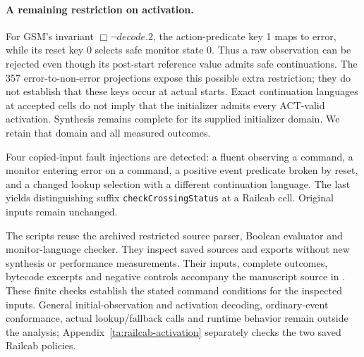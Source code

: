 \paragraph{A remaining restriction on activation.}
For GSM's invariant $\Box\neg\mathit{decode.2}$, the action-predicate key 1 maps to error, while its reset key 0 selects safe monitor state 0. Thus a raw observation can be rejected even though its post-start reference value admits safe continuations. The 357 error-to-non-error projections expose this possible extra restriction; they do not establish that these keys occur at actual starts. Exact continuation languages at accepted cells do not imply that the initializer admits every ACT-valid activation. Synthesis remains complete for its supplied initializer domain. We retain that domain and all measured outcomes.

Four copied-input fault injections are detected: a fluent observing a command, a monitor entering error on a command, a positive event predicate broken by reset, and a changed lookup selection with a different continuation language. The last yields distinguishing suffix \texttt{checkCrossingStatus} at a Railcab cell. Original inputs remain unchanged.

The scripts reuse the archived restricted source parser, Boolean evaluator and monitor-language checker. They inspect saved sources and exports without new synthesis or performance measurements. Their inputs, complete outcomes, bytecode excerpts and negative controls accompany the manuscript source in . These finite checks establish the stated command conditions for the inspected inputs. General initial-observation and activation decoding, ordinary-event conformance, actual lookup/fallback calls and runtime behavior remain outside the analysis; Appendix~\ref{ta:railcab-activation} separately checks the two saved Railcab policies.

